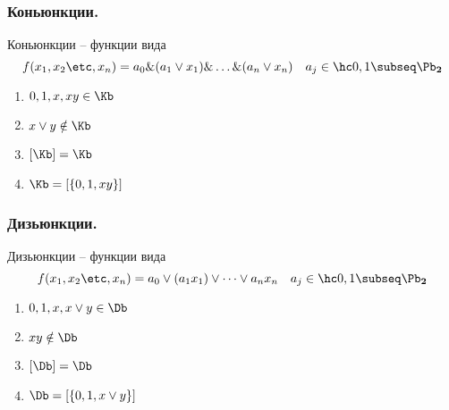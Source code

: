 \documentclass[unicode,10pt]{article}
\begin{document}
\subsubsection{Коньюнкции.}
  \begin{df}
    Коньюнкции -- функции вида
    \begin{displaymath}
      f(\set[x]{n}) = a_0\&(a_1\vee x_1)\&\dots\&(a_n\vee x_n) \quad \pcoef
    \end{displaymath}
  \end{df}
  \property
  \begin{enumerate}
    \item $0, 1, x, xy \in \Kb$
    \item $x\vee y\notin \Kb$
    \item $[\Kb] = \Kb $
    \item $\Kb = [\{0,1,xy\}]$
  \end{enumerate}
\subsubsection{Дизьюнкции.}
  \begin{df}
    Дизьюнкции -- функции вида
    \begin{displaymath}
      f(\set[x]{n}) = a_0\vee(a_1x_1)\vee\dots\vee a_nx_n \quad \pcoef
    \end{displaymath}
  \end{df}
  \property
  \begin{enumerate}
    \item $0, 1, x, x\vee y \in \Db$
    \item $xy \notin \Db$
    \item $[\Db] = \Db $
    \item $\Db = [\{0, 1, x\vee y\}]$
  \end{enumerate}
\end{document}
